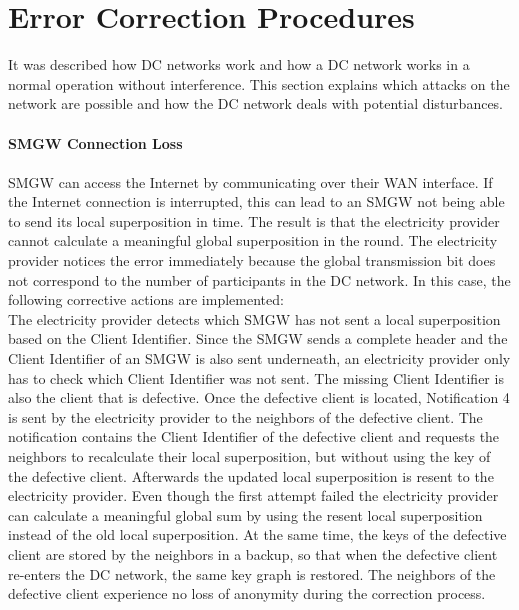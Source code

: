 \section{Error Correction Procedures}
\label{error_corr}
It was described how DC networks work and how a DC network works in a normal operation without interference. This section explains which attacks on the network are possible and how the DC network deals with potential disturbances.
\\
\\
\textbf{SMGW Connection Loss}
\label{error_corr_conn}
\\
\\
\gls{SMGW} can access the Internet by communicating over their \gls{WAN} interface. If the Internet connection is interrupted, this can lead to an \gls{SMGW} not being able to send its local superposition in time. The result is that the electricity provider cannot calculate a meaningful global superposition in the round. The electricity provider notices the error immediately because the global transmission bit does not correspond to the number of participants in the DC network. In this case, the following corrective actions are implemented:\\ %
The electricity provider detects which \gls{SMGW} has not sent a local superposition based on the Client Identifier. Since the \gls{SMGW} sends a complete header and the Client Identifier of an \gls{SMGW} is also sent underneath, an electricity provider only has to check which Client Identifier was not sent. The missing Client Identifier is also the client that is defective. Once the defective client is located, Notification 4 is sent by the electricity provider to the neighbors of the defective client. The notification contains the Client Identifier of the defective client and requests the neighbors to recalculate their local superposition, but without using the key of the defective client. Afterwards the updated local superposition is resent to the electricity provider. Even though the first attempt failed the electricity provider can calculate a meaningful global sum by using the resent local superposition instead of the old local superposition. At the same time, the keys of the defective client are stored by the neighbors in a backup, so that when the defective client re-enters the DC network, the same key graph is restored. The neighbors of the defective client experience no loss of anonymity during the correction process.\\%
